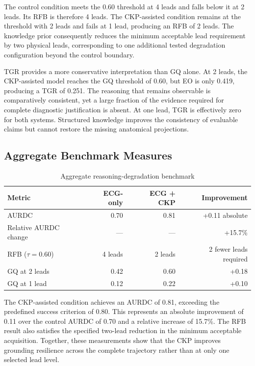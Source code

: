 \documentclass{ssnreview}
\begin{document}
The control condition meets the 0.60 threshold at 4 leads and falls below it at 2 leads.
Its RFB is therefore 4 leads. The CKP-assisted condition remains at the threshold with
2 leads and fails at 1 lead, producing an RFB of 2 leads. The knowledge prior consequently
reduces the minimum acceptable lead requirement by two physical leads, corresponding to
one additional tested degradation configuration beyond the control boundary.

TGR provides a more conservative interpretation than GQ alone. At 2 leads, the
CKP-assisted model reaches the GQ threshold of 0.60, but EO is only 0.419, producing a
TGR of 0.251. The reasoning that remains observable is comparatively consistent, yet a
large fraction of the evidence required for complete diagnostic justification is absent.
At one lead, TGR is effectively zero for both systems. Structured knowledge improves the
consistency of evaluable claims but cannot restore the missing anatomical projections.

\subsection{Aggregate Benchmark Measures}

\begin{table}[H]
  \centering
  \caption{Aggregate reasoning-degradation benchmark}
  \label{tab:aggregate-results}
  \begin{tabular}{@{}lrrr@{}}
    \toprule
    \textbf{Metric} & \textbf{ECG-only} & \textbf{ECG + CKP} &
    \textbf{Improvement} \\
    \midrule
    AURDC & 0.70 & 0.81 & +0.11 absolute \\
    Relative AURDC change & --- & --- & +15.7\% \\
    RFB ($\tau=0.60$) & 4 leads & 2 leads & 2 fewer leads required \\
    GQ at 2 leads & 0.42 & 0.60 & +0.18 \\
    GQ at 1 lead & 0.12 & 0.22 & +0.10 \\
    \bottomrule
  \end{tabular}
\end{table}

The CKP-assisted condition achieves an AURDC of 0.81, exceeding the predefined success
criterion of 0.80. This represents an absolute improvement of 0.11 over the control
AURDC of 0.70 and a relative increase of 15.7\%. The RFB result also satisfies the
specified two-lead reduction in the minimum acceptable acquisition. Together, these
measurements show that the CKP improves grounding resilience across the complete
trajectory rather than at only one selected lead level.
\end{document}
